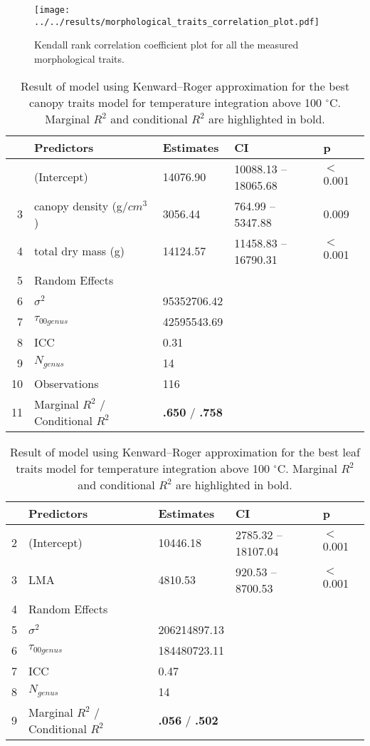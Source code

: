 \documentclass[12pt]{report}
\begin{document}
\begin{figure}
\centering
\caption{Kendall rank correlation coefficient plot for all the measured morphological traits.}
\texttt{[image: ../../results/morphological\_traits\_correlation\_plot.pdf]}
\end{figure}

\clearpage

\begin{table}[ht]
\centering
\caption{Result of model using Kenward--Roger approximation for the best canopy traits model for temperature integration above 100 $^{\circ}$C. Marginal $R^2$ and conditional $R^2$ are highlighted in bold.}
\begin{tabular}{rllll}
 \hline
 & Predictors & Estimates & CI & p
 \\ 
  \hline
 & (Intercept) & 14076.90 & 10088.13 – 18065.68 & $<$0.001 \\ 

3 & canopy density (g/{$cm^3$}) & 3056.44 & 764.99 – 5347.88 & 0.009 \\ 
  4 & total dry mass (g) & 14124.57 & 11458.83 – 16790.31 & $<$0.001 \\ 
  5 & Random Effects &  &  &  \\ 
  6 & $\sigma^2$ & 95352706.42 &  &  \\ 
  7 & $\tau_{00genus}$ & 42595543.69 &  &  \\ 
  8 & ICC & 0.31 &  &  \\ 
  9 & $N_{genus}$ & 14 &  &  \\ 
  10 & Observations & 116 &  &  \\ 
  11 & Marginal $R^2$ / Conditional $R^2$ & \textbf{.650} / \textbf{.758} &  &  \\ 
   \hline
\end{tabular}
\end{table}

\begin{table}[ht]
\centering
\caption{Result of model using Kenward--Roger approximation for the best leaf traits model for temperature integration above 100 $^{\circ}$C. Marginal $R^2$ and conditional $R^2$ are highlighted in bold.}
\begin{tabular}{rllll}
  \hline
 & Predictors & Estimates & CI & p \\ 
  \hline
2 & (Intercept) & 10446.18 & 2785.32 – 18107.04 & $<$0.001 \\ 
  3 & LMA & 4810.53 & 920.53 – 8700.53 & $<$0.001 \\ 
  4 & Random Effects &  &  &  \\ 
  5 & $\sigma^2$ & 206214897.13 &  &  \\ 
  6 & $\tau_{00 genus}$ & 184480723.11 &  &  \\ 
  7 & ICC & 0.47 &  &  \\ 
  8 & $N_{genus}$ & 14 &  &  \\ 
  9 & Marginal $R^2$ / Conditional $R^2$ & \textbf{.056} / \textbf{.502} &  &  \\ 
   \hline
\end{tabular}
\end{table}
\end{document}
